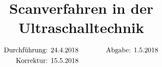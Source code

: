 

\subject{US2}
\title{Scanverfahren in der Ultraschalltechnik}

\date{
  \begin{align}
    \text{Durchführung: } & \text{24.4.2018} & \hspace{3em} & \text{Abgabe: 1.5.2018} \notag
\\  \text{Korrektur: } & \text{15.5.2018} & \hspace {3em} & \notag
  \end{align}
}




\maketitle
\thispagestyle{empty}
\tableofcontents
\newpage






\nocite{*}
\printbibliography{}


